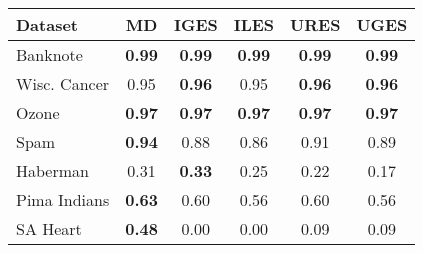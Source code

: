 \begin{tabular}{lccccc}
\toprule
Dataset & MD & IGES & ILES & URES & UGES \\
\midrule
Banknote & \textbf{0.99} & \textbf{0.99} & \textbf{0.99} & \textbf{0.99} & \textbf{0.99} \\
Wisc. Cancer & 0.95 & \textbf{0.96} & 0.95 & \textbf{0.96} & \textbf{0.96} \\
Ozone & \textbf{0.97} & \textbf{0.97} & \textbf{0.97} & \textbf{0.97} & \textbf{0.97} \\
Spam & \textbf{0.94} & 0.88 & 0.86 & 0.91 & 0.89 \\
Haberman & 0.31 & \textbf{0.33} & 0.25 & 0.22 & 0.17 \\
Pima Indians & \textbf{0.63} & 0.60 & 0.56 & 0.60 & 0.56 \\
SA Heart & \textbf{0.48} & 0.00 & 0.00 & 0.09 & 0.09 \\
\bottomrule
\end{tabular}
